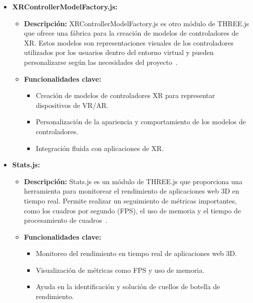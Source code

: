 \documentclass[a4paper, 12pt]{book}
\begin{document}
\begin{itemize}
  \item \textbf{XRControllerModelFactory.js:}
    \begin{itemize}
      \item \textbf{Descripción:} XRControllerModelFactory.js es otro módulo de THREE.js que ofrece una fábrica para la creación de modelos de controladores de 
      XR. Estos modelos son representaciones visuales de los controladores utilizados por los usuarios dentro del entorno virtual y pueden 
      personalizarse según las necesidades del proyecto~\cite{Documentacion_WebXR}.
      \item \textbf{Funcionalidades clave:}
      \begin{itemize}
        \item Creación de modelos de controladores XR para representar dispositivos de VR/AR.
        \item Personalización de la apariencia y comportamiento de los modelos de controladores.
        \item Integración fluida con aplicaciones de XR.
      \end{itemize}
    \end{itemize}
  
  \item \textbf{Stats.js:}
    \begin{itemize}
      \item \textbf{Descripción:} Stats.js es un módulo de THREE.js que proporciona una herramienta para monitorear el rendimiento de aplicaciones web 3D en tiempo real. 
      Permite realizar un seguimiento de métricas importantes, como los cuadros por segundo (FPS), el uso de memoria y el tiempo de procesamiento de cuadros~\cite{Statsjs}.
      \item \textbf{Funcionalidades clave:}
      \begin{itemize}
        \item Monitoreo del rendimiento en tiempo real de aplicaciones web 3D.
        \item Visualización de métricas como FPS y uso de memoria.
        \item Ayuda en la identificación y solución de cuellos de botella de rendimiento.
      \end{itemize}
    \end{itemize}
  

\end{itemize}
\end{document}

